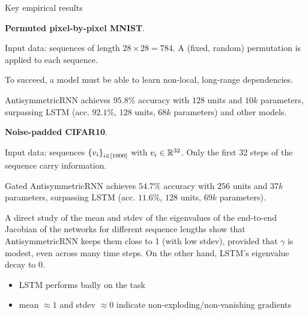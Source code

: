 \documentclass[10pt,xcolor={table,dvipsnames}]{beamer} 		%
\theoremstyle{plain}					%
\theoremstyle{definition}
\theoremstyle{remark}
\begin{document}
	\begin{frame}{Key empirical results}

		\textbf{Permuted pixel-by-pixel MNIST}.

		Input data: sequences of length $28\times 28=784$.
		A (fixed, random) permutation is applied to each sequence.

		To succeed, a model must be able to learn non-local, long-range dependencies. 

		AntisymmetricRNN achieves $95.8\%$ accuracy 
		with $128$ units and $10k$ parameters, surpassing LSTM (acc. $92.1\%$, 
		$128$ units, $68k$ parameters) and other models.
		\medskip


		\textbf{Noise-padded CIFAR10}.

		Input data: sequences $\qty{v_i}_{i\in[1000]}$ with $v_i\in\R{32}$. Only the 
		first $32$ steps of the sequence carry information.

		Gated AntisymmetricRNN achieves $54.7\%$ accuracy with $256$ units and $37k$ parameters, 
		surpassing LSTM (acc. $11.6\%$, $128$ units, $69k$ parameters). 
		\smallskip

		A direct study of the mean and stdev of the eigenvalues of the end-to-end Jacobian 
		of the networks for different sequence lengths
		show that AntisymmetricRNN keeps them close to 1 (with low stdev), 
		provided that $\gamma$ is modest, even across many time steps. 
		On the other hand, LSTM's eigenvalue decay to $0$. 
		\begin{itemize}
			\item LSTM performs badly on the task
			\item mean $\approx 1$ and stdev $\approx 0$ indicate 
			non-exploding/non-vanishing gradients
		\end{itemize}
	\end{frame}
\end{document}

